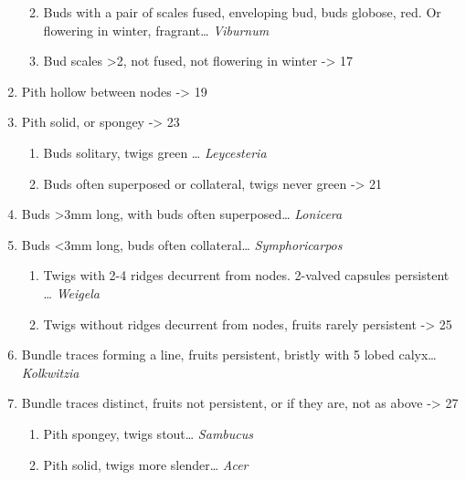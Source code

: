 \documentclass[openany]{book}
\providecommand{\tightlist}{%
  \setlength{\itemsep}{0pt}\setlength{\parskip}{0pt}}
\begin{document}
\begin{enumerate}
  \begin{enumerate}
  \def\labelenumii{\arabic{enumii}.}
  \setcounter{enumii}{14}
  \tightlist
  \item
    Buds with a pair of scales fused, enveloping bud, buds globose, red.
    Or flowering in winter, fragrant\ldots{} \emph{Viburnum}
  \item
    Bud scales \textgreater{}2, not fused, not flowering in winter
    -\textgreater{} 17
  \end{enumerate}
\item
  Pith hollow between nodes -\textgreater{} 19
\item
  Pith solid, or spongey -\textgreater{} 23

  \begin{enumerate}
  \def\labelenumii{\arabic{enumii}.}
  \setcounter{enumii}{18}
  \tightlist
  \item
    Buds solitary, twigs green \ldots{} \emph{Leycesteria}
  \item
    Buds often superposed or collateral, twigs never green
    -\textgreater{} 21
  \end{enumerate}
\item
  Buds \textgreater{}3mm long, with buds often superposed\ldots{}
  \emph{Lonicera}
\item
  Buds \textless{}3mm long, buds often collateral\ldots{}
  \emph{Symphoricarpos}

  \begin{enumerate}
  \def\labelenumii{\arabic{enumii}.}
  \setcounter{enumii}{22}
  \tightlist
  \item
    Twigs with 2-4 ridges decurrent from nodes. 2-valved capsules
    persistent \ldots{} \emph{Weigela}
  \item
    Twigs without ridges decurrent from nodes, fruits rarely persistent
    -\textgreater{} 25
  \end{enumerate}
\item
  Bundle traces forming a line, fruits persistent, bristly with 5 lobed
  calyx\ldots{}\emph{Kolkwitzia}
\item
  Bundle traces distinct, fruits not persistent, or if they are, not as
  above -\textgreater{} 27

  \begin{enumerate}
  \def\labelenumii{\arabic{enumii}.}
  \setcounter{enumii}{26}
  \tightlist
  \item
    Pith spongey, twigs stout\ldots{} \emph{Sambucus}
  \item
    Pith solid, twigs more slender\ldots{} \emph{Acer}
  \end{enumerate}
\end{enumerate}
\end{document}
